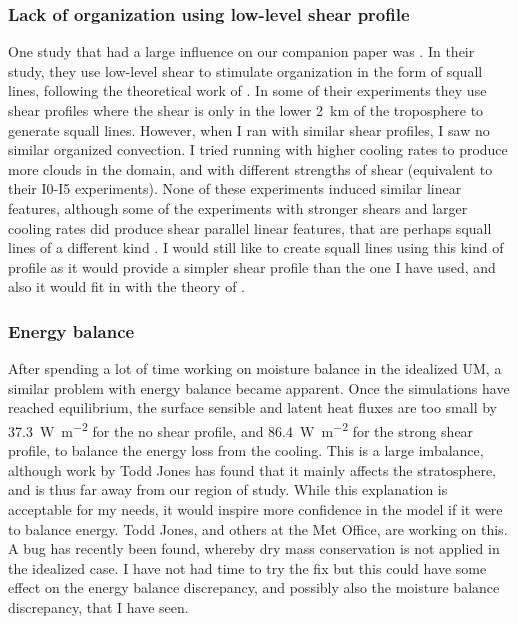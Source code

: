 \documentclass[11pt,a4paper]{article}
\begin{document}
\subsubsection{Lack of organization using low-level shear profile}
One study that had a large influence on our companion paper was \cite{RE2001}. In their study, they use low-level shear to stimulate organization in the form of squall lines, following the theoretical work of \cite{RKW1988}. In some of their experiments they use shear profiles where the shear is only in the lower \SI{2}{km} of the troposphere to generate squall lines. However, when I ran with similar shear profiles, I saw no similar organized convection. I tried running with higher cooling rates to produce more clouds in the domain, and with different strengths of shear (equivalent to their I0-I5 experiments). None of these experiments induced similar linear features, although some of the experiments with stronger shears and larger cooling rates did produce shear parallel linear features, that are perhaps squall lines of a different kind \parencite{parker2007simulated}. I would still like to create squall lines using this kind of profile as it would provide a simpler shear profile than the one I have used, and also it would fit in with the theory of \cite{RKW1988}.

\subsubsection{Energy balance}
After spending a lot of time working on moisture balance in the idealized UM, a similar problem with energy balance became apparent. 
Once the simulations have reached equilibrium, the surface sensible and latent heat fluxes are too small by \SI{37.3}{W.m^{-2}} for the no shear profile, and \SI{86.4}{W.m^{-2}} for the strong shear profile, to balance the energy loss from the cooling.
This is a large imbalance, although work by Todd Jones has found that it mainly affects the stratosphere, and is thus far away from our region of study. While this explanation is acceptable for my needs, it would inspire more confidence in the model if it were to balance energy. Todd Jones, and others at the Met Office, are working on this. A bug has recently been found, whereby dry mass conservation is not applied in the idealized case. I have not had time to try the fix but this could have some effect on the energy balance discrepancy, and possibly also the moisture balance discrepancy, that I have seen.
\end{document}

